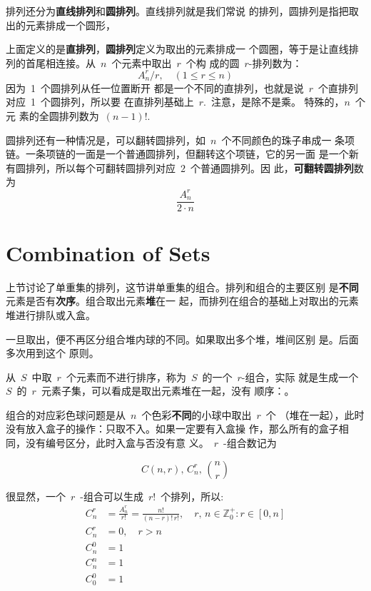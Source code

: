 排列还分为\textbf{直线排列}和\textbf{圆排列}。直线排列就是我们常说
的排列，圆排列是指把取出的元素排成一个圆形，

上面定义的是\textbf{直排列}，\textbf{圆排列}定义为取出的元素排成一
个圆圈，等于是让直线排列的首尾相连接。从~$n$~个元素中取出~$r$~个构
成的圆~$r$-排列数为：
\[ A_n^r/r,\quad (1 \leq r \leq n) \]因为~1~个圆排列从任一位置断开
都是一个不同的直排列，也就是说~$r$~个直排列对应~1~个圆排列，所以要
在直排列基础上~$r$.~注意，是除不是乘。 特殊的，$n$~个元
素的全圆排列数为~$(n - 1)!$.

圆排列还有一种情况是，可以翻转圆排列，如~$n$~个不同颜色的珠子串成一
条项链。一条项链的一面是一个普通圆排列，但翻转这个项链，它的另一面
是一个新有圆排列，所以每个可翻转圆排列对应~$2$~个普通圆排列。因
此，\textbf{可翻转圆排列}数为 \[ \frac{A_n^r}{2 \cdot n} \]

\section{Combination of Sets}
\label{sec:combination-sets}

上节讨论了单重集的排列，这节讲单重集的组合。排列和组合的主要区别
是\textbf{不同}元素是否有\textbf{次序}。组合取出元素\textbf{堆}在一
起，而排列在组合的基础上对取出的元素堆进行排队或入盒。

一旦取出，便不再区分组合堆内球的不同。如果取出多个堆，堆间区别
是。后面多次用到这个
原则。

从~$S$~中取~$r$~个元素而不进行排序，称为~$S$~的一个~$r$-组合，实际
就是生成一个~$S$~的~$r$~元素子集，可以看成是取出元素堆在一起，没有
顺序：。

组合的对应彩色球问题是从~$n$~个色彩\textbf{不同}的小球中取出~$r$~个
（堆在一起），此时没有放入盒子的操作：只取不入。如果一定要有入盒操
作，那么所有的盒子相同，没有编号区分，此时入盒与否没有意
义。~$r$~-组合数记为

\[ C(n,r),\, C_n^r,\, \binom{n}{r} \]

很显然，一个~$r$~-组合可以生成~$r!$~个排列，所以:
\begin{align*}
  C_n^r &=  \frac{A_n^r}{r!} = \frac{n!}{(n - r)!\,r!}, \quad r,\,
          n \in \mathbb{Z}_0^{+}: r \in [0, n] \\
  C_n^r &= 0, \quad r > n \\
  C_n^0 &= 1 \\
  C_n^n &= 1 \\
  C_0^0 &= 1
\end{align*}

